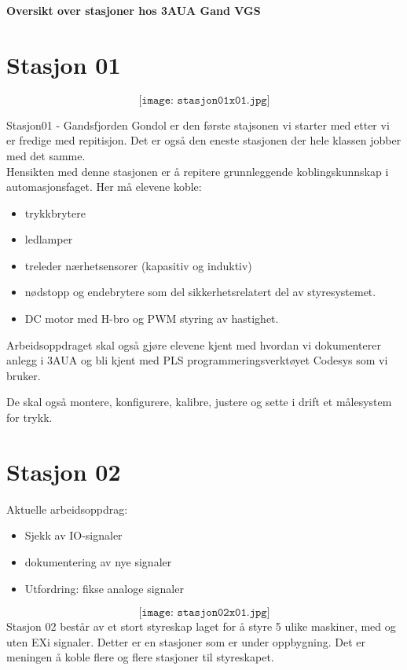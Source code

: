 
\noindent
\begin{center}
{\bf Oversikt over stasjoner hos 3AUA Gand VGS }
\end{center}
\vskip 5pt
\section{Stasjon 01}

$$\texttt{[image: stasjon01x01.jpg]}$$

Stasjon01 - Gandsfjorden Gondol er den første stajsonen vi starter med etter vi er fredige med repitisjon. Det er også den eneste stasjonen der hele klassen jobber med det samme. \\

Hensikten med denne stasjonen er å repitere grunnleggende koblingskunnskap i automasjonsfaget. Her må elevene koble:
\begin{itemize}[noitemsep]
	\item trykkbrytere
	\item ledlamper
	\item treleder nærhetsensorer (kapasitiv og induktiv)
	\item nødstopp og endebrytere som del sikkerhetsrelatert del av styresystemet. 
	\item DC motor med H-bro og PWM styring av hastighet. 
\end{itemize}




Arbeidsoppdraget skal også gjøre elevene kjent med hvordan vi dokumenterer anlegg i 3AUA og bli kjent med PLS programmeringsverktøyet Codesys som vi bruker. 

De skal også montere, konfigurere, kalibre, justere og sette i drift et målesystem for trykk. 

\section{Stasjon 02}

Aktuelle arbeidsoppdrag:

\begin{itemize}[noitemsep]
	\item Sjekk av IO-signaler
	\item dokumentering av nye signaler
	\item Utfordring: fikse analoge signaler
\end{itemize}



$$\texttt{[image: stasjon02x01.jpg]}$$
Stasjon 02 består av et stort styreskap laget for å styre 5 ulike maskiner, med og uten EXi signaler. Detter er en stasjoner som er under oppbygning. Det er meningen å koble flere og flere stasjoner til  styreskapet. \\




